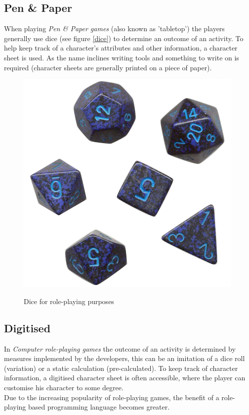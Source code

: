 \subsection*{Pen \& Paper}
When playing \emph{Pen \& Paper games} (also known as 'tabletop') the players generally use dice (see figure \vref{dice}) to determine an outcome of an activity. To help keep track of a character's attributes and other information, a character sheet is used.
As the name inclines writing tools and something to write on is required (character sheets are generally printed on a piece of paper).
\begin{figure}[!h]
\centering
\includegraphics[scale=0.4]{img/rpgdice.png}
\caption{Dice for role-playing purposes}
\cite{rpgdice}
\label{dice}
\end{figure}
\subsection*{Digitised}
In \emph{Computer role-playing games} the outcome of an activity is determined by measures implemented by the developers, this can be an imitation of a dice roll (variation) or a static calculation (pre-calculated).
To keep track of character information, a digitised character sheet is often accessible, where the player can customise his character to some degree.\\
Due to the increasing popularity of role-playing games, the benefit of a role-playing based programming language becomes greater.
\pagebreak

